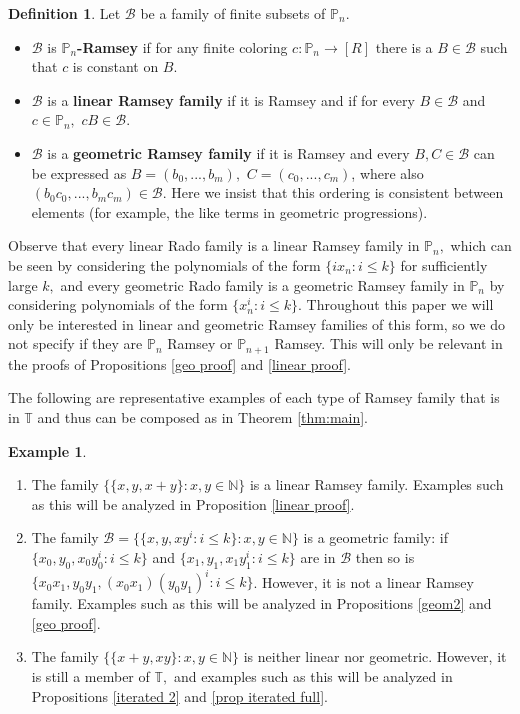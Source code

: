 \documentclass[10pt,a4paper]{article}
\theoremstyle{definition}
\newtheorem{definition}[theorem]{Definition}
\newtheorem{example}[theorem]{Example}
\begin{document}
\begin{definition}\label{def ramsey}
Let $\mathcal{B}$ be a family of finite subsets of $\mathbb{P}_n.$
\begin{itemize}
    \item $\mathcal{B}$ is \textbf{$\mathbb{P}_n$-Ramsey} if for any finite coloring $c:\mathbb{P}_n\rightarrow [R]$ there is a $B\in\mathcal{B}$ such that $c$ is constant on $B.$ 
    \item $\mathcal{B}$ is a \textbf{linear Ramsey family} if it is Ramsey and if for every $B\in\mathcal{B}$ and $c\in \mathbb{P}_n,$ $cB\in \mathcal{B}.$
    \item $\mathcal{B}$ is a \textbf{geometric Ramsey family} if it is Ramsey and every $B,C\in\mathcal{B}$ can be expressed as $B=(b_0,...,b_m),$ $C=(c_0,...,c_m)$, where also $(b_0c_0,...,b_mc_m)\in \mathcal{B}.$ Here we insist that this ordering is consistent between elements (for example, the like terms in geometric progressions).
\end{itemize}
\end{definition}

Observe that every linear Rado family is a linear Ramsey family in $\mathbb{P}_n,$ which can be seen by considering the polynomials of the form $\{ix_{n}: i\leq k\}$ for sufficiently large $k,$ and every geometric Rado family is a geometric Ramsey family in $\mathbb{P}_n$ by considering polynomials of the form $\{x_{n}^i: i\leq k\}.$  Throughout this paper we will only be interested in linear and geometric Ramsey families of this form, so we do not specify if they are $\mathbb{P}_n$ Ramsey or $\mathbb{P}_{n+1}$ Ramsey.  This will only be relevant in the proofs of Propositions \ref{geo proof} and \ref{linear proof}. 

The following are representative examples of each type of Ramsey family that is in $\mathbb{T}$ and thus can be composed as in Theorem \ref{thm:main}.  

\begin{example}

\hspace{2mm}
    \begin{enumerate}
        \item The family $\{\{x,y, x+y\}: x,y\in\mathbb{N}\}$ is a linear Ramsey family.  Examples such as this will be analyzed in Proposition \ref{linear proof}.

        \item The family $\mathcal{B}=\{\{x,y,xy^i: i\leq k\}: x,y\in \mathbb{N}\}$ is a geometric family: if $\{x_0,y_0,x_0y_0^i:i\leq k\}$ and $\{x_1,y_1,x_1y_1^i:i\leq k\}$ are in $\mathcal{B}$ then so is $\{x_0x_1, y_0y_1, (x_0x_1)(y_0y_1)^i: i\leq k\}$.  However, it is not a linear Ramsey family.  Examples such as this will be analyzed in Propositions \ref{geom2} and \ref{geo proof}.

        \item The family $\{\{x+y, xy\}: x,y\in\mathbb{N}\}$ is neither linear nor geometric.  However, it is still a member of $\mathbb{T},$ and examples such as this will be analyzed in Propositions \ref{iterated 2} and \ref{prop iterated full}.  
    \end{enumerate}
\end{example}
\end{document}

